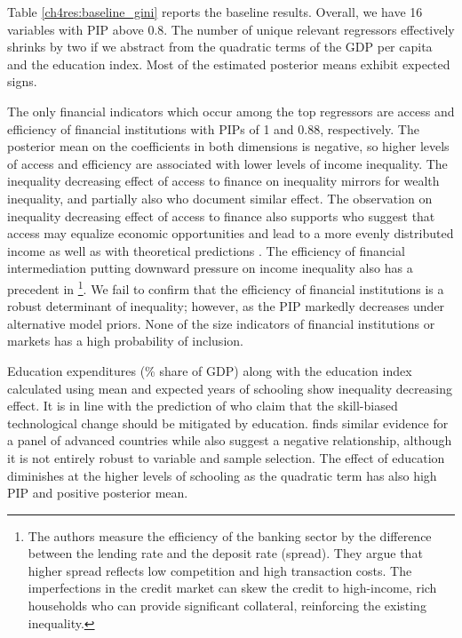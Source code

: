 \begin{refsection}

Table \ref{ch4res:baseline_gini} reports the baseline results. Overall, we have 16 variables with \ac{PIP} above 0.8. The number of unique relevant regressors effectively shrinks by two if we abstract from the quadratic terms of the \ac{GDP} per capita and the education index. Most of the estimated posterior means exhibit expected signs.

The only financial indicators which occur among the top regressors are access and efficiency of financial institutions with \acp{PIP} of 1 and 0.88, respectively. The posterior mean on the coefficients in both dimensions is negative, so higher levels of access and efficiency are associated with lower levels of income inequality. The inequality decreasing effect of access to finance on inequality mirrors \textcite{hasan2020finance} for wealth inequality, and partially also \textcite{furceri2019robust, naceurzhang2016} who document similar effect. The observation on inequality decreasing effect of access to finance also supports \textcite{claessens2007finance} who suggest that access may equalize economic opportunities and lead to a more evenly distributed income as well as with theoretical predictions \parencite{braunetal2019,galormoav2004,banerjeenewman1990}. The efficiency of financial intermediation putting downward pressure on income inequality also has a precedent in \textcite{gimet2011closer}\footnote{The authors measure the efficiency of the banking sector by the difference between the lending rate and the deposit rate (spread). They argue that higher spread reflects low competition and high transaction costs. The imperfections in the credit market can skew the credit to high-income, rich households who can provide significant collateral, reinforcing the existing inequality.}. We fail to confirm that the efficiency of financial institutions is a robust determinant of inequality; however, as the \ac{PIP} markedly decreases under alternative model priors. None of the size indicators of financial institutions or markets has a high probability of inclusion.

Education expenditures (\% share of \ac{GDP}) along with the education index calculated using mean and expected years of schooling show inequality decreasing effect. It is in line with the prediction of \textcite{goldin2009race,deaton2013great} who claim that the skill-biased technological change should be mitigated by education. \textcite{oecd2011divided} finds similar evidence for a panel of advanced countries while \textcite{furceri2019robust} also suggest a negative relationship, although it is not entirely robust to variable and sample selection. The effect of education diminishes at the higher levels of schooling as the quadratic term has also high \ac{PIP} and positive posterior mean. 


\end{refsection}
